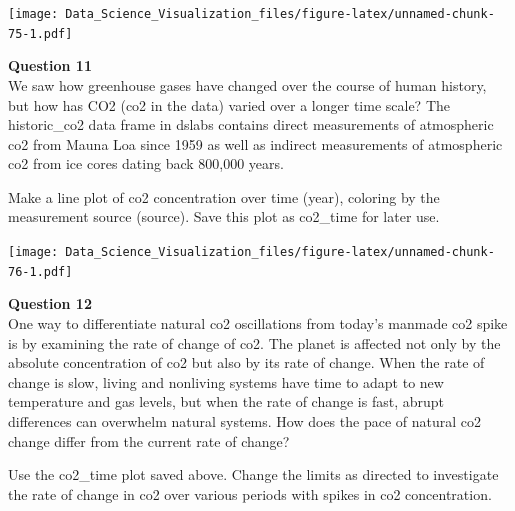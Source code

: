 \documentclass[
]{article}
\newenvironment{Shaded}{\begin{snugshade}}{\end{snugshade}}
\newcommand{\DataTypeTok}[1]{\textcolor[rgb]{0.13,0.29,0.53}{#1}}
\newcommand{\KeywordTok}[1]{\textcolor[rgb]{0.13,0.29,0.53}{\textbf{#1}}}
\newcommand{\NormalTok}[1]{#1}
\newcommand{\OperatorTok}[1]{\textcolor[rgb]{0.81,0.36,0.00}{\textbf{#1}}}
\newcommand{\StringTok}[1]{\textcolor[rgb]{0.31,0.60,0.02}{#1}}
\begin{document}
\begin{Shaded}
\end{Shaded}

\texttt{[image: Data\_Science\_Visualization\_files/figure-latex/unnamed-chunk-75-1.pdf]}

\textbf{Question 11}\\
We saw how greenhouse gases have changed over the course of human
history, but how has CO2 (co2 in the data) varied over a longer time
scale? The historic\_co2 data frame in dslabs contains direct
measurements of atmospheric co2 from Mauna Loa since 1959 as well as
indirect measurements of atmospheric co2 from ice cores dating back
800,000 years.

Make a line plot of co2 concentration over time (year), coloring by the
measurement source (source). Save this plot as co2\_time for later use.

\begin{Shaded}
\end{Shaded}

\texttt{[image: Data\_Science\_Visualization\_files/figure-latex/unnamed-chunk-76-1.pdf]}

\textbf{Question 12}\\
One way to differentiate natural co2 oscillations from today's manmade
co2 spike is by examining the rate of change of co2. The planet is
affected not only by the absolute concentration of co2 but also by its
rate of change. When the rate of change is slow, living and nonliving
systems have time to adapt to new temperature and gas levels, but when
the rate of change is fast, abrupt differences can overwhelm natural
systems. How does the pace of natural co2 change differ from the current
rate of change?

Use the co2\_time plot saved above. Change the limits as directed to
investigate the rate of change in co2 over various periods with spikes
in co2 concentration.
\end{document}
